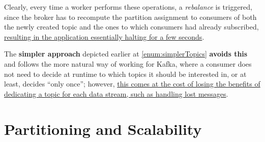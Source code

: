 Clearly, every time a worker performs these operations, a \textit{rebalance} is triggered, since the broker has to recompute the partition assignment to consumers of both the newly created topic and the ones to which consumers had already subscribed,
\ul{resulting in the application essentially halting for a few seconds}.

The \textbf{simpler approach} depicted earlier at \ref{enum:simplerTopics} \textbf{avoids this} and follows the more natural way of working for Kafka, where a consumer does not need to decide at runtime to which topics it should be interested in, or at least, decides ``only once'';
however, \ul{this comes at the cost of losing the benefits of dedicating a topic for each data stream, such as handling lost messages}.




\newpage
\section{Partitioning and Scalability}
